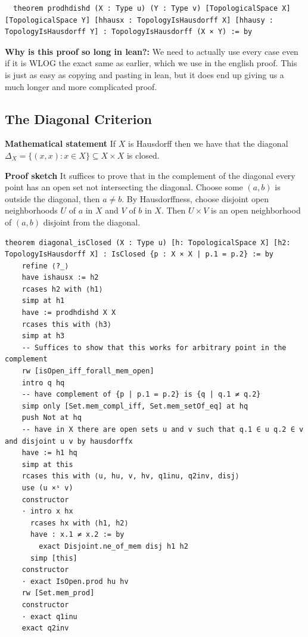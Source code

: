 \documentclass[11pt]{article}
\begin{document}
\begin{verbatim}
  theorem prodhdishd (X : Type u) (Y : Type v) [TopologicalSpace X] [TopologicalSpace Y] [hhausx : TopologyIsHausdorff X] [hhausy : TopologyIsHausdorff Y] : TopologyIsHausdorff (X × Y) := by
\end{verbatim}


\medskip
\noindent
\textbf{Why is this proof so long in lean?:} We need to actually use every case even if it is WLOG the exact same as earlier, which we use in the english proof. This is just as easy as copying and pasting in lean, but it does end up giving us a much longer and more complicated proof. 

\subsection{The Diagonal Criterion}

\textbf{Mathematical statement} 
If $X$ is Hausdorff then we have that the diagonal $\Delta_X = \{(x,x) : x\in X\}\subseteq X\times X$ is closed.

\textbf{Proof sketch} 
It suffices to prove that in the complement of the diagonal every point has an open set not intersecting the diagonal. Choose some $(a,b)$ is outside the diagonal, then $a\neq b$. By Hausdorffness, choose disjoint open neighborhoods $U$ of $a$ in $X$ and $V$ of $b$ in $X$. Then $U\times V$ is an open neighborhood of $(a,b)$ disjoint from the diagonal.

\begin{verbatim}
theorem diagonal_isClosed (X : Type u) [h: TopologicalSpace X] [h2: TopologyIsHausdorff X] : IsClosed {p : X × X | p.1 = p.2} := by 
    refine ⟨?_⟩
    have ishausx := h2
    rcases h2 with ⟨h1⟩
    simp at h1
    have := prodhdishd X X 
    rcases this with ⟨h3⟩
    simp at h3
    -- Suffices to show that this works for arbitrary point in the complement
    rw [isOpen_iff_forall_mem_open]
    intro q hq 
    -- have complement of {p | p.1 = p.2} is {q | q.1 ≠ q.2}
    simp only [Set.mem_compl_iff, Set.mem_setOf_eq] at hq 
    push Not at hq 
    -- have in X there are open sets u and v such that q.1 ∈ u q.2 ∈ v and disjoint u v by hausdorffx
    have := h1 hq 
    simp at this
    rcases this with ⟨u, hu, v, hv, q1inu, q2inv, disj⟩
    use (u ×ˢ v) 
    constructor
    · intro x hx
      rcases hx with ⟨h1, h2⟩ 
      have : x.1 ≠ x.2 := by 
        exact Disjoint.ne_of_mem disj h1 h2
      simp [this]
    constructor
    · exact IsOpen.prod hu hv     
    rw [Set.mem_prod]
    constructor
    · exact q1inu
    exact q2inv
\end{verbatim}
\end{document}
